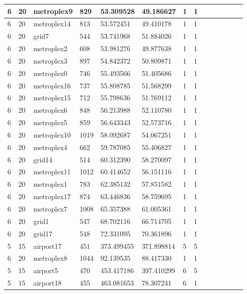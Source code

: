 \documentclass[../thesis.tex]{subfiles}
\begin{document}
\begin{table}[!ht]
\begin{tabularx}{\textwidth}{|X|X|X|X|X|X|X|X|X|X|X|X|X|X|}
        6 & 20 & metroplex9 & 829 & 53.309528 & 49.186627 & 1 & 1 \\ \hline
        6 & 20 & metroplex14 & 813 & 53.572451 & 49.410178 & 1 & 1 \\ \hline
        6 & 20 & grid7 & 544 & 53.741968 & 51.884026 & 1 & 1 \\ \hline
        6 & 20 & metroplex2 & 608 & 53.981276 & 49.877638 & 1 & 1 \\ \hline
        6 & 20 & metroplex3 & 897 & 54.842372 & 50.809871 & 1 & 1 \\ \hline
        6 & 20 & metroplex0 & 746 & 55.493566 & 51.405686 & 1 & 1 \\ \hline
        6 & 20 & metroplex16 & 737 & 55.808785 & 51.568299 & 1 & 1 \\ \hline
        6 & 20 & metroplex15 & 712 & 55.798636 & 51.769112 & 1 & 1 \\ \hline
        6 & 20 & metroplex6 & 848 & 56.213988 & 52.110780 & 1 & 1 \\ \hline
        6 & 20 & metroplex5 & 859 & 56.643343 & 52.573716 & 1 & 1 \\ \hline
        6 & 20 & metroplex10 & 1019 & 58.092687 & 54.067251 & 1 & 1 \\ \hline
        6 & 20 & metroplex4 & 662 & 59.787085 & 55.406827 & 1 & 1 \\ \hline
        6 & 20 & grid14 & 514 & 60.312390 & 58.270097 & 1 & 1 \\ \hline
        6 & 20 & metroplex11 & 1012 & 60.414652 & 56.151116 & 1 & 1 \\ \hline
        6 & 20 & metroplex1 & 783 & 62.385132 & 57.851582 & 1 & 1 \\ \hline
        6 & 20 & metroplex17 & 874 & 63.446836 & 58.759695 & 1 & 1 \\ \hline
        6 & 20 & metroplex7 & 1008 & 65.357388 & 61.005361 & 1 & 1 \\ \hline
        6 & 20 & grid1 & 547 & 68.702116 & 66.714705 & 1 & 1 \\ \hline
        6 & 20 & grid17 & 548 & 72.331095 & 70.361896 & 1 & 1 \\ \hline
        5 & 15 & airport17 & 451 & 373.499455 & 371.898814 & 5 & 5 \\ \hline
        6 & 20 & metroplex8 & 1044 & 92.139535 & 88.417330 & 1 & 1 \\ \hline
        5 & 15 & airport5 & 470 & 453.417186 & 397.410299 & 6 & 5 \\ \hline
        5 & 15 & airport18 & 455 & 463.081653 & 78.307241 & 6 & 1 \\ \hline

\end{tabularx}
\end{table}
\end{document}
